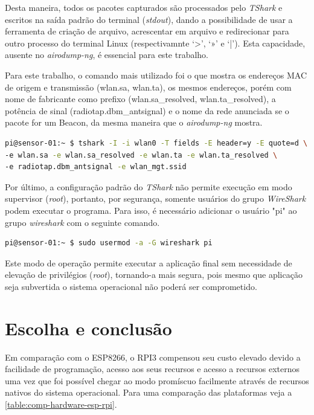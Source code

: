 Desta maneira, todos os pacotes capturados são processados pelo \emph{TShark} e
escritos na saída padrão do terminal (\emph{stdout}), dando a possibilidade de
usar a ferramenta de criação de arquivo, acrescentar em arquivo e redirecionar
para outro processo do terminal Linux (respectivamnte ‘>’, ‘»’ e ‘|’). Esta
capacidade, ausente no \emph{airodump-ng}, é essencial para este trabalho.

Para este trabalho, o comando mais utilizado foi o que mostra os endereços MAC
de origem e transmissão (wlan.sa, wlan.ta), os mesmos endereços, porém com nome
de fabricante como prefixo (wlan.sa\_resolved, wlan.ta\_resolved), a potência de
sinal (radiotap.dbm\_antsignal) e o nome da rede anunciada se o pacote for um
Beacon, da mesma maneira que o \emph{airodump-ng} mostra.

\begin{lstlisting}[language=bash,caption={TShark e opções},label=code-tshark]
pi@sensor-01:~ $ tshark -I -i wlan0 -T fields -E header=y -E quote=d \
-e wlan.sa -e wlan.sa_resolved -e wlan.ta -e wlan.ta_resolved \
-e radiotap.dbm_antsignal -e wlan_mgt.ssid
\end{lstlisting}

Por último, a configuração padrão do \emph{TShark} não permite execução em modo
supervisor (\emph{root}), portanto, por segurança, somente usuários do grupo
\emph{WireShark} podem executar o programa. Para isso, é necessário adicionar o
usuário "pi"  ao grupo \emph{wireshark} com o seguinte comando.

\begin{lstlisting}[language=bash,caption={Adição do usuário pi ao grupo \emph{wireshark}},label=code-usermod]
pi@sensor-01:~ $ sudo usermod -a -G wireshark pi
\end{lstlisting}

Este modo de operação permite executar a aplicação final sem necessidade de
elevação de privilégios (\emph{root}), tornando-a mais segura, pois mesmo que
aplicação seja subvertida o sistema operacional não poderá ser comprometido.

\section{Escolha e conclusão}
\label{sec:escolha-plataforma}

Em comparação com o ESP8266, o RPI3 compensou seu custo elevado devido a
facilidade de programação, acesso aos seus recursos e acesso a recursos externos uma
vez que foi possível chegar ao modo promíscuo facilmente através de recursos nativos do
sistema operacional. Para uma comparação das plataformas veja a \autoref{table:comp-hardware-esp-rpi}.

